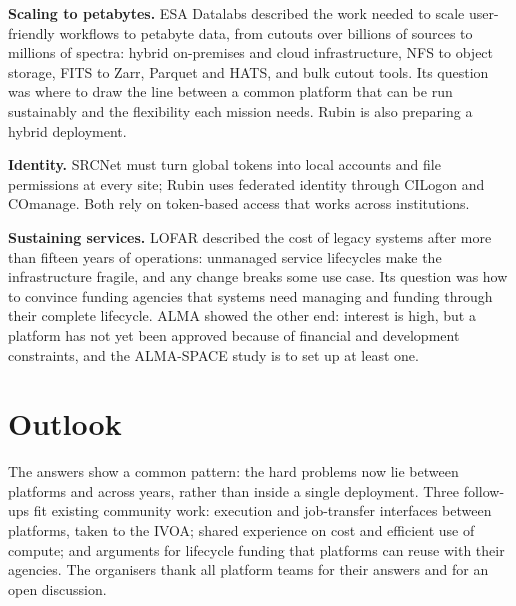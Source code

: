 \documentclass[11pt,twoside]{article}
\begin{document}
\textbf{Scaling to petabytes.} ESA Datalabs described the work needed to scale
user-friendly workflows to petabyte data, from cutouts over billions of sources
to millions of spectra: hybrid on-premises and cloud infrastructure, NFS to
object storage, FITS to Zarr, Parquet and HATS, and bulk cutout tools. Its
question was where to draw the line between a common platform that can be run
sustainably and the flexibility each mission needs. Rubin is also preparing a
hybrid deployment.

\textbf{Identity.} SRCNet must turn global tokens into local accounts and file
permissions at every site; Rubin uses federated identity through CILogon and
COmanage. Both rely on token-based access that works across institutions.

\textbf{Sustaining services.} LOFAR described the cost of legacy systems after
more than fifteen years of operations: unmanaged service lifecycles make the
infrastructure fragile, and any change breaks some use case. Its question was
how to convince funding agencies that systems need managing and funding
through their complete lifecycle. ALMA showed the other end: interest is high,
but a platform has not yet been approved because of financial and development
constraints, and the ALMA-SPACE study is to set up at least one.

\section{Outlook}

The answers show a common pattern: the hard problems now lie between platforms
and across years, rather than inside a single deployment. Three follow-ups fit
existing community work: execution and job-transfer interfaces between
platforms, taken to the IVOA; shared experience on cost and efficient use of
compute; and arguments for lifecycle funding that platforms can reuse with
their agencies. The organisers thank all platform teams for their answers and
for an open discussion.



\end{document}
